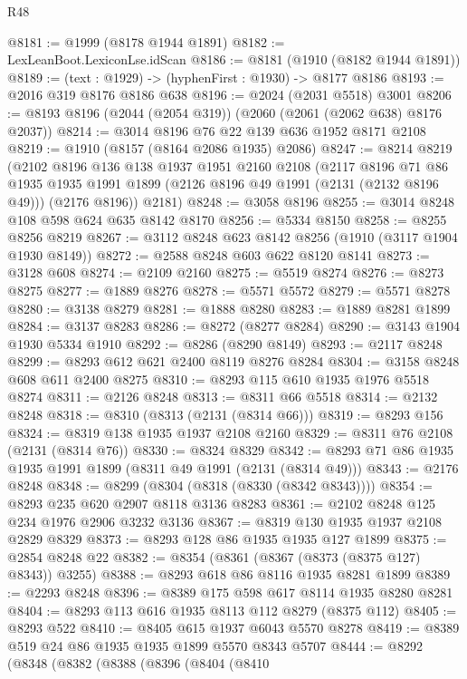 \begin{lexlean}{R48}
\begin{coremodule}
@8181 := @1999 (@8178 @1944 @1891)
@8182 := LexLeanBoot.LexiconLse.idScan
@8186 := @8181 (@1910 (@8182 @1944 @1891))
@8189 := (text : @1929) -> (hyphenFirst : @1930) -> @8177 @8186
@8193 := @2016 @319 @8176 @8186 @638
@8196 := @2024 (@2031 @5518) @3001
@8206 := @8193 @8196 (@2044 (@2054 @319)) (@2060 (@2061 (@2062 @638) @8176 @2037))
@8214 := @3014 @8196 @76 @22 @139 @636 @1952 @8171 @2108
@8219 := @1910 (@8157 (@8164 @2086 @1935) @2086)
@8247 := @8214
    @8219
    (@2102
      @8196
      @136
      @138
      @1937
      @1951
      @2160
      @2108
      (@2117
        @8196
        @71
        @86
        @1935
        @1935
        @1991
        @1899
        (@2126 @8196 @49 @1991 (@2131 (@2132 @8196 @49)))
        (@2176 @8196))
      @2181)
@8248 := @3058 @8196
@8255 := @3014 @8248 @108 @598 @624 @635 @8142 @8170
@8256 := @5334 @8150
@8258 := @8255 @8256 @8219
@8267 := @3112 @8248 @623 @8142 @8256 (@1910 (@3117 @1904 @1930 @8149))
@8272 := @2588 @8248 @603 @622 @8120 @8141
@8273 := @3128 @608
@8274 := @2109 @2160
@8275 := @5519 @8274
@8276 := @8273 @8275
@8277 := @1889 @8276
@8278 := @5571 @5572
@8279 := @5571 @8278
@8280 := @3138 @8279
@8281 := @1888 @8280
@8283 := @1889 @8281 @1899
@8284 := @3137 @8283
@8286 := @8272 (@8277 @8284)
@8290 := @3143 @1904 @1930 @5334 @1910
@8292 := @8286 (@8290 @8149)
@8293 := @2117 @8248
@8299 := @8293 @612 @621 @2400 @8119 @8276 @8284
@8304 := @3158 @8248 @608 @611 @2400 @8275
@8310 := @8293 @115 @610 @1935 @1976 @5518 @8274
@8311 := @2126 @8248
@8313 := @8311 @66 @5518
@8314 := @2132 @8248
@8318 := @8310 (@8313 (@2131 (@8314 @66)))
@8319 := @8293 @156
@8324 := @8319 @138 @1935 @1937 @2108 @2160
@8329 := @8311 @76 @2108 (@2131 (@8314 @76))
@8330 := @8324 @8329
@8342 := @8293 @71 @86 @1935 @1935 @1991 @1899 (@8311 @49 @1991 (@2131 (@8314 @49)))
@8343 := @2176 @8248
@8348 := @8299 (@8304 (@8318 (@8330 (@8342 @8343))))
@8354 := @8293 @235 @620 @2907 @8118 @3136 @8283
@8361 := @2102 @8248 @125 @234 @1976 @2906 @3232 @3136
@8367 := @8319 @130 @1935 @1937 @2108 @2829 @8329
@8373 := @8293 @128 @86 @1935 @1935 @127 @1899
@8375 := @2854 @8248 @22
@8382 := @8354 (@8361 (@8367 (@8373 (@8375 @127) @8343)) @3255)
@8388 := @8293 @618 @86 @8116 @1935 @8281 @1899
@8389 := @2293 @8248
@8396 := @8389 @175 @598 @617 @8114 @1935 @8280 @8281
@8404 := @8293 @113 @616 @1935 @8113 @112 @8279 (@8375 @112)
@8405 := @8293 @522
@8410 := @8405 @615 @1937 @6043 @5570 @8278
@8419 := @8389 @519 @24 @86 @1935 @1935 @1899 @5570 @8343 @5707
@8444 := @8292
    (@8348
      (@8382
        (@8388
          (@8396
            (@8404
              (@8410

\end{coremodule}
\end{lexlean}
